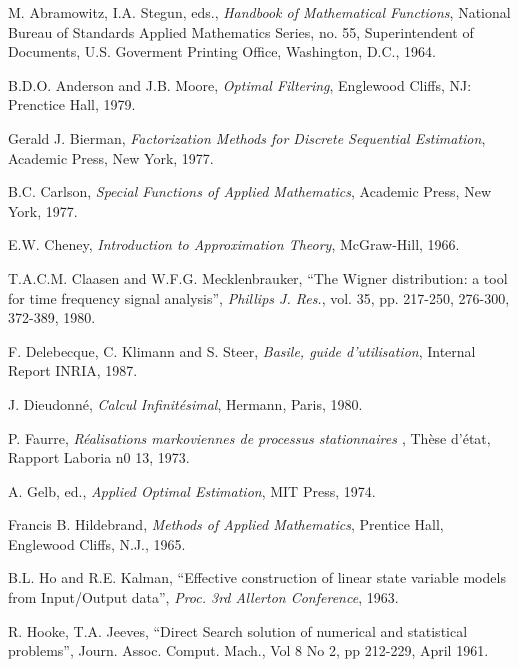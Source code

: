 
\begin{thebibliography}{99}

\label{ref}

 M. Abramowitz, I.A. Stegun, eds., {\em Handbook of Mathematical Functions}, National Bureau of Standards Applied Mathematics Series, no. 55, Superintendent of Documents, U.S. Goverment Printing Office, Washington, D.C., 1964.

 B.D.O. Anderson and J.B. Moore, {\em Optimal Filtering}, Englewood Cliffs, NJ: Prenctice Hall, 1979.

 Gerald J. Bierman, {\em Factorization Methods for Discrete Sequential Estimation}, Academic Press, New York, 1977.


 B.C. Carlson, {\em Special Functions of Applied Mathematics}, Academic Press, New York, 1977.

 E.W. Cheney, {\em Introduction to Approximation Theory}, McGraw-Hill, 1966.

 T.A.C.M. Claasen and W.F.G. Mecklenbrauker, ``The Wigner distribution: a tool for time frequency signal analysis'', {\em Phillips J. Res.}, vol. 35, pp. 217-250, 276-300, 372-389, 1980.

 F. Delebecque, C. Klimann and S. Steer, {\em Basile, guide d'utilisation}, Internal Report INRIA, 1987.

 J. Dieudonn\'e, {\em Calcul Infinit\'esimal}, Hermann, Paris, 1980.

 P. Faurre, {\em R\'ealisations markoviennes de processus stationnaires \em}, Th\`ese d'\'etat, Rapport Laboria n0 13, 1973.

 A. Gelb, ed., {\em Applied Optimal Estimation}, MIT Press, 1974.

 Francis B. Hildebrand, {\em Methods of Applied Mathematics}, Prentice Hall, Englewood Cliffs, N.J., 1965.

 B.L. Ho and R.E. Kalman, ``Effective construction of linear state variable models from Input/Output data'', {\em Proc. 3rd Allerton Conference}, 1963.

 R. Hooke, T.A. Jeeves, ``Direct Search solution of numerical and statistical problems'', Journ. Assoc. Comput. Mach., Vol 8 No 2, pp 212-229, April 1961.


\end{thebibliography}
